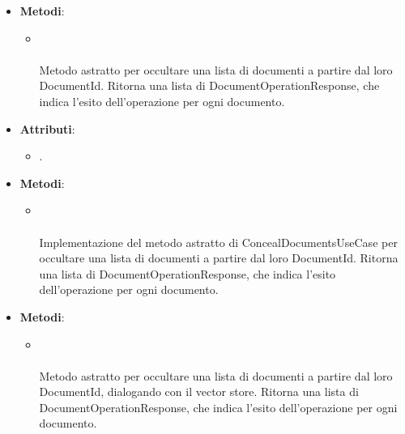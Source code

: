 \documentclass[10pt, a4paper]{article}
\begin{document}
    \label{ConcealDocumentsUseCaseDettaglio}
    \begin{itemize}
        \item \textbf{Metodi}:
        \begin{itemize}
            \item {}\\ \\
            Metodo astratto per occultare una lista di documenti a partire dal loro DocumentId. Ritorna una lista di DocumentOperationResponse, che indica l'esito dell'operazione per ogni documento.
        \end{itemize}
    \end{itemize}
    
    \label{ConcealDocumentsServiceDettaglio}
    \begin{itemize}
        \item \textbf{Attributi}:
        \begin{itemize}
            \item {}.  
        \end{itemize}
        \item \textbf{Metodi}:
        \begin{itemize}
            \item {}\\ \\
            Implementazione del metodo astratto di ConcealDocumentsUseCase per occultare una lista di documenti a partire dal loro DocumentId. Ritorna una lista di DocumentOperationResponse, che indica l'esito dell'operazione per ogni documento.
        \end{itemize}
    \end{itemize}
    
    \label{ConcealDocumentsPortDettaglio}
    \begin{itemize}
        \item \textbf{Metodi}:
        \begin{itemize}
            \item {}\\ \\
            Metodo astratto per occultare una lista di documenti a partire dal loro DocumentId, dialogando con il vector store. Ritorna una lista di DocumentOperationResponse, che indica l'esito dell'operazione per ogni documento.
        \end{itemize}
    \end{itemize}
    
\end{document}
